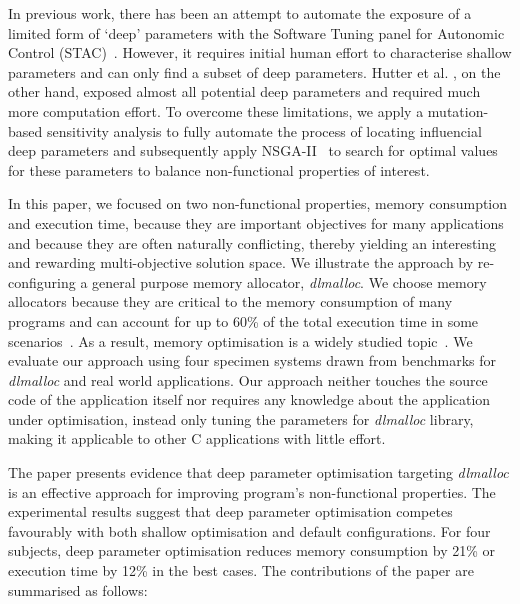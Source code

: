 In previous work, there has been an attempt to automate the exposure of a limited form of `deep' parameters with the Software Tuning panel for Autonomic Control (STAC)~\cite{Brake:2008:ADS:1370018.1370031}. However, it requires initial human effort to characterise shallow parameters and can only find a subset of deep parameters. Hutter et al. \cite{4401979}, on the other hand, exposed almost all potential deep parameters and required much more computation effort. To overcome these limitations, we apply a mutation-based sensitivity analysis to fully automate the process of locating influencial deep parameters and subsequently apply NSGA-II~\cite{996017} to search for optimal values for these parameters to balance non-functional properties of interest. 

In this paper, we focused on two non-functional properties, memory consumption and execution time, because they are important objectives for many applications and because they are often naturally conflicting, thereby yielding an interesting and rewarding multi-objective solution space. We illustrate the approach by re-configuring a general purpose memory allocator, \emph{dlmalloc}. We choose memory allocators because they are critical to the memory consumption of many programs and can account for up to 60\% of the total execution time in some scenarios~\cite{Zorn:1992:EMS:142181.142200}. As a result, memory optimisation is a widely studied topic~\cite{RiscoMartin2010572,Risco-Martin:2009:ODM:1569901.1570116}. We evaluate our approach using four specimen systems drawn from benchmarks for \emph{dlmalloc} and real world applications. Our approach neither touches the source code of the application itself nor requires any knowledge about the application under optimisation, instead only tuning the parameters for \emph{dlmalloc} library, making it applicable to other C applications with little effort.


The paper presents evidence that deep parameter optimisation targeting \emph{dlmalloc} is an effective approach for improving program's non-functional properties. 
The experimental results suggest that deep parameter optimisation competes favourably with both shallow optimisation and default configurations. For four subjects, deep parameter optimisation reduces memory consumption by 21\% or execution time by 12\% in the best cases. The contributions of the paper are summarised as follows:

